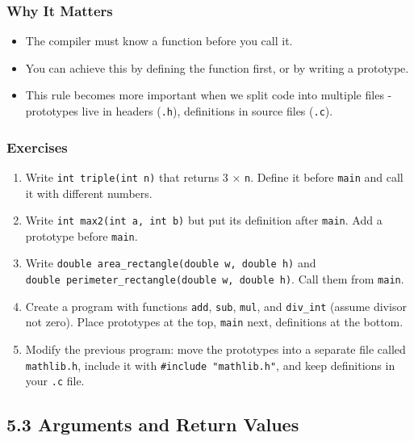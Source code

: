 \documentclass[
  letterpaper,
  DIV=11,
  numbers=noendperiod]{scrreprt}
\providecommand{\tightlist}{%
  \setlength{\itemsep}{0pt}\setlength{\parskip}{0pt}}
\begin{document}
\subsubsection{Why It Matters}\label{why-it-matters-20}

\begin{itemize}
\tightlist
\item
  The compiler must know a function before you call it.
\item
  You can achieve this by defining the function first, or by writing a
  prototype.
\item
  This rule becomes more important when we split code into multiple
  files - prototypes live in headers (\texttt{.h}), definitions in
  source files (\texttt{.c}).
\end{itemize}

\subsubsection{Exercises}\label{exercises-21}

\begin{enumerate}
\def\labelenumi{\arabic{enumi}.}
\tightlist
\item
  Write \texttt{int\ triple(int\ n)} that returns 3 × \texttt{n}. Define
  it before \texttt{main} and call it with different numbers.
\item
  Write \texttt{int\ max2(int\ a,\ int\ b)} but put its definition after
  \texttt{main}. Add a prototype before \texttt{main}.
\item
  Write \texttt{double\ area\_rectangle(double\ w,\ double\ h)} and
  \texttt{double\ perimeter\_rectangle(double\ w,\ double\ h)}. Call
  them from \texttt{main}.
\item
  Create a program with functions \texttt{add}, \texttt{sub},
  \texttt{mul}, and \texttt{div\_int} (assume divisor not zero). Place
  prototypes at the top, \texttt{main} next, definitions at the bottom.
\item
  Modify the previous program: move the prototypes into a separate file
  called \texttt{mathlib.h}, include it with
  \texttt{\#include\ "mathlib.h"}, and keep definitions in your
  \texttt{.c} file.
\end{enumerate}

\subsection{5.3 Arguments and Return
Values}\label{arguments-and-return-values}
\end{document}
